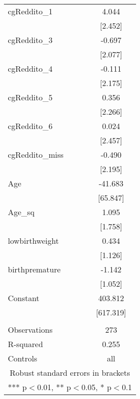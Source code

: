 \documentclass[]{article}
\begin{document}
\begin{tabular}{lc}
cgReddito\_1 & 4.044 \\
 & [2.452] \\
cgReddito\_3 & -0.697 \\
 & [2.077] \\
cgReddito\_4 & -0.111 \\
 & [2.175] \\
cgReddito\_5 & 0.356 \\
 & [2.266] \\
cgReddito\_6 & 0.024 \\
 & [2.457] \\
cgReddito\_miss & -0.490 \\
 & [2.195] \\
Age & -41.683 \\
 & [65.847] \\
Age\_sq & 1.095 \\
 & [1.758] \\
lowbirthweight & 0.434 \\
 & [1.126] \\
birthpremature & -1.142 \\
 & [1.052] \\
Constant & 403.812 \\
 & [617.319] \\
 &  \\
Observations & 273 \\
R-squared & 0.255 \\
 Controls & all \\ \hline
\multicolumn{2}{c}{ Robust standard errors in brackets} \\
\multicolumn{2}{c}{ *** p$<$0.01, ** p$<$0.05, * p$<$0.1} \\
\end{tabular}
\end{document}
